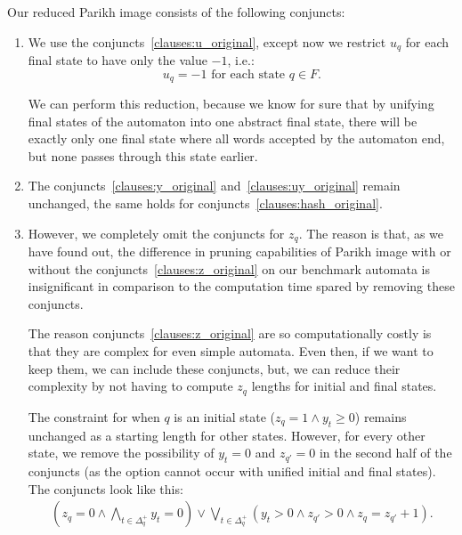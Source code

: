 Our reduced Parikh image consists of the following conjuncts:
\begin{enumerate}
    \item \label{clauses:u_reduced} We use the conjuncts~\ref{clauses:u_original}, except now we restrict $u_q$ for each final state to have only the value $-1$, i.e.:
    $$ u_{q} = -1 \text{ for each state } q \in F \text{.}$$

    We can perform this reduction, because we know for sure that by unifying final states of the automaton into one abstract final state, there will be exactly only one final state where all words accepted by the automaton end, but none passes through this state earlier.

    \item \label{clauses:y_reduced} \label{clauses:uy_reduced} \label{clauses:hash_reduced} The conjuncts~\ref{clauses:y_original} and~\ref{clauses:uy_original} remain unchanged, the same holds for conjuncts~\ref{clauses:hash_original}.

    \item \label{clauses:z_reduced} However, we completely omit the conjuncts for $z_{q}$. The reason is that, as we have found out, the difference in pruning capabilities of Parikh image with or without the conjuncts~\ref{clauses:z_original} on our benchmark automata is insignificant in comparison to the computation time spared by removing these conjuncts.

    The reason conjuncts~\ref{clauses:z_original} are so computationally costly is that they are complex for even simple automata. Even then, if we want to keep them, we can include these conjuncts, but, we can reduce their complexity by not having to compute $z_q$ lengths for initial and final states.

    The constraint for when $q$ is an initial state ($z_q = 1 \land y_t \geq 0$) remains unchanged as a starting length for other states. However, for every other state, we remove the possibility of $y_t = 0$ and $z_{q'} = 0$ in the second half of the conjuncts (as the option cannot occur with unified initial and final states). The conjuncts look like this:
    {
    \begin{align*}
		(z_q = 0 \land \bigwedge_{t \in \Delta_q^+} y_t = 0) \lor \bigvee_{t \in \Delta_q^+} (y_t > 0 \land z_{q'} > 0 \land z_q = z_{q'} + 1) \text{.}
    \end{align*}
    }

\end{enumerate}


